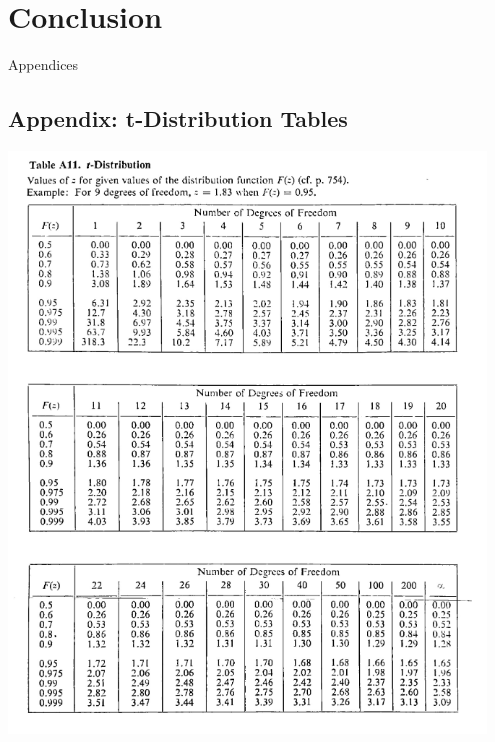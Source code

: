 \documentclass{article}
\begin{document}
\section{Conclusion}




\newpage
\thispagestyle{empty}  %
\begin{center}
	\vspace*{\fill}
	{\Huge Appendices}
	\vspace*{\fill}
\end{center}

\newpage
\begin{appendices}
\pagestyle{fancy}
\renewcommand{\thefigure}{A\arabic{figure}}
\setcounter{figure}{0}

\section*{Appendix: t-Distribution Tables}
\hypertarget{1}{\includegraphics[width=0.95\textwidth]{t_distribution_Table_lecture3.png}}
\end{appendices}
\end{document}
